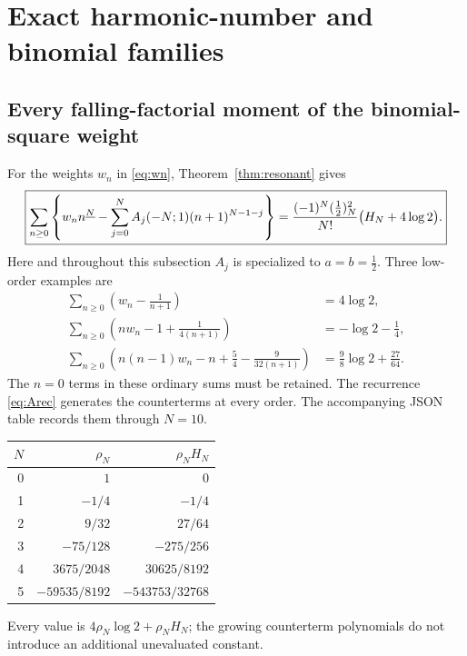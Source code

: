 \section{Exact harmonic-number and binomial families}\label{sec:harmonics}

\subsection{Every falling-factorial moment of the binomial-square weight}
For the weights $w_n$ in \eqref{eq:wn}, Theorem~\ref{thm:resonant} gives
\begin{equation}\label{eq:binomialall}
 \boxed{\sum_{n\ge0}\left\{
 w_nn^{\underline{N}}-\sum_{j=0}^N A_j(-N;1)(n+1)^{N-1-j}\right\}
 =\frac{(-1)^N(\tfrac12)_N^2}{N!}\bigl(H_N+4\log2\bigr).}
\end{equation}
Here and throughout this subsection $A_j$ is specialized to
$a=b=\tfrac12$.  Three low-order examples are
\begin{align}
 \sum_{n\ge0}\left(w_n-\frac1{n+1}\right)
 &=4\log2,\label{eq:bin0}\\
 \sum_{n\ge0}\left(nw_n-1+\frac1{4(n+1)}\right)
 &=-\log2-\frac14,\label{eq:bin1}\\
 \sum_{n\ge0}\left(n(n-1)w_n-n+\frac54-\frac9{32(n+1)}\right)
 &=\frac98\log2+\frac{27}{64}.\label{eq:bin2}
\end{align}
The $n=0$ terms in these ordinary sums must be retained.
The recurrence \eqref{eq:Arec} generates the counterterms at every order.
The accompanying JSON table records them through $N=10$.

\begin{center}
\begin{tabular}{@{}rrr@{}}
\toprule
$N$ & $\rho_N$ & $\rho_N H_N$\\
\midrule
0 & $1$ & $0$\\
1 & $-1/4$ & $-1/4$\\
2 & $9/32$ & $27/64$\\
3 & $-75/128$ & $-275/256$\\
4 & $3675/2048$ & $30625/8192$\\
5 & $-59535/8192$ & $-543753/32768$\\
\bottomrule
\end{tabular}
\end{center}
Every value is $4\rho_N\log2+\rho_NH_N$; the growing counterterm
polynomials do not introduce an additional unevaluated constant.

